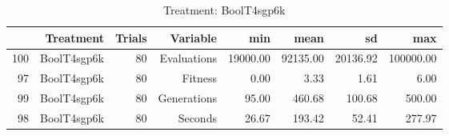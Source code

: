 \begin{table}[ht]
\centering
\begin{tabular}{rrrrrrrr}
  \hline
 & Treatment & Trials & Variable & min & mean & sd & max \\ 
  \hline
100 & BoolT4sgp6k &  80 & Evaluations & 19000.00 & 92135.00 & 20136.92 & 100000.00 \\ 
  97 & BoolT4sgp6k &  80 & Fitness & 0.00 & 3.33 & 1.61 & 6.00 \\ 
  99 & BoolT4sgp6k &  80 & Generations & 95.00 & 460.68 & 100.68 & 500.00 \\ 
  98 & BoolT4sgp6k &  80 & Seconds & 26.67 & 193.42 & 52.41 & 277.97 \\ 
   \hline
\end{tabular}
\caption{Treatment: BoolT4sgp6k} 
\end{table}

